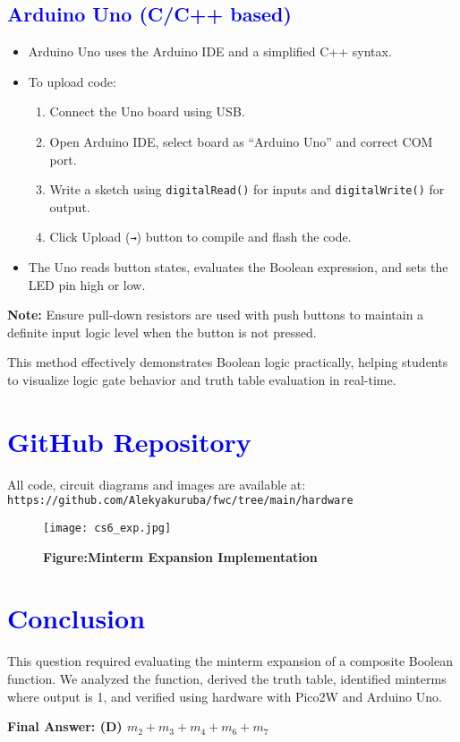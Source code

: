 \documentclass[twocolumn]{article}
\begin{document}
\subsection*{\textcolor{blue}{Arduino Uno (C/C++ based)}}

\begin{itemize}
    \item Arduino Uno uses the Arduino IDE and a simplified C++ syntax.
    \item To upload code:
    \begin{enumerate}
        \item Connect the Uno board using USB.
        \item Open Arduino IDE, select board as “Arduino Uno” and correct COM port.
        \item Write a sketch using \texttt{digitalRead()} for inputs and \texttt{digitalWrite()} for output.
        \item Click Upload (\texttt{→}) button to compile and flash the code.
    \end{enumerate}
    \item The Uno reads button states, evaluates the Boolean expression, and sets the LED pin high or low.
\end{itemize}

\textbf{Note:} Ensure pull-down resistors are used with push buttons to maintain a definite input logic level when the button is not pressed.

This method effectively demonstrates Boolean logic practically, helping students to visualize logic gate behavior and truth table evaluation in real-time.



\section*{\textcolor{blue}{GitHub Repository}}

All code, circuit diagrams and images are available at: \\
\texttt{https://github.com/Alekyakuruba/fwc/tree/main/hardware}
\begin{figure}[h]
    \centering
    \texttt{[image: cs6\_exp.jpg]}
    \caption*{\textbf{Figure:Minterm Expansion Implementation}}
\end{figure}

\section*{\textcolor{blue}{Conclusion}}

This question required evaluating the minterm expansion of a composite Boolean function. We analyzed the function, derived the truth table, identified minterms where output is 1, and verified using hardware with Pico2W and Arduino Uno.

\textbf{Final Answer: (D) $m_2 + m_3 + m_4 + m_6 + m_7$}
\end{document}
